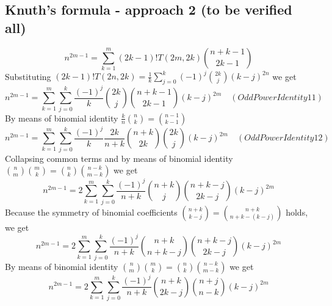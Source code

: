 \subsection{Knuth's formula - approach 2 (to be verified all)}\label{subsec:knuth's-formula---approach-2-(to-be-verified-all)}
\begin{equation*}
    n^{2m-1} = \sum_{k=1}^{m} (2k-1)! T(2m,2k) \binom{n+k-1}{2k-1}
\end{equation*}
Substituting $(2k-1)!T(2n,2k) = \frac{1}{k} \sum_{j=0}^{k} (-1)^j \binom{2k}{j} (k-j)^{2n}$ we get
\begin{equation*}
    n^{2m-1} = \sum_{k=1}^{m} \sum_{j=0}^{k} \frac{(-1)^j}{k} \binom{2k}{j} \binom{n+k-1}{2k-1} (k-j)^{2m} \quad
    (OddPowerIdentity11)
\end{equation*}
By means of binomial identity $\frac{k}{n} \binom{n}{k} = \binom{n-1}{k-1}$
\begin{equation*}
    n^{2m-1} = \sum_{k=1}^{m} \sum_{j=0}^{k} \frac{(-1)^{j}}{k} \frac{2k}{n+k} \binom{n+k}{2k} \binom{2k}{j} (k-j)^{2m} \quad
    (OddPowerIdentity12)
\end{equation*}
Collapsing common terms and by means of binomial identity $\binom{n}{m} \binom{m}{k} = \binom{n}{k} \binom{n-k}{m-k}$ we get
\begin{equation*}
    n^{2m-1} = 2\sum_{k=1}^{m} \sum_{j=0}^{k} \frac{(-1)^{j}}{n+k} \binom{n+k}{j} \binom{n+k-j}{2k-j} (k-j)^{2m}
\end{equation*}
Because the symmetry of binomial coefficients $\binom{n+k}{k-j} = \binom{n+k}{n+k-(k-j)}$ holds, we get
\begin{equation*}
    n^{2m-1} = 2\sum_{k=1}^{m} \sum_{j=0}^{k} \frac{(-1)^{j}}{n+k} \binom{n+k}{n+k-j} \binom{n+k-j}{2k-j} (k-j)^{2m}
\end{equation*}
By means of binomial identity $\binom{n}{m} \binom{m}{k} = \binom{n}{k} \binom{n-k}{m-k}$ we get
\begin{equation*}
    n^{2m-1} = 2\sum_{k=1}^{m} \sum_{j=0}^{k} \frac{(-1)^{j}}{n+k} \binom{n+k}{2k-j} \binom{n+j}{n-k} (k-j)^{2m}
\end{equation*}
